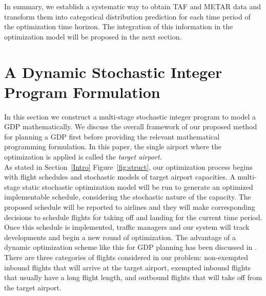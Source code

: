 \documentclass[12pt]{article}
\begin{document}
	\newline
	In summary, we establish a systematic way to obtain TAF and METAR data and transform them into categorical distribution prediction for each time period of the optimization time horizon. The integration of this information in the optimization model will be proposed in the next section.

\section{A Dynamic Stochastic Integer Program Formulation}\label{Model}
	In this section we construct a multi-stage stochastic integer program to model a GDP mathematically. We discuss the overall framework of our proposed method for planning a GDP first before providing the relevant mathematical programming formulation.  In this paper, the single airport where the optimization is applied is called the {\em target airport}.\\
	\newline As stated in Section~\ref{Intro} Figure~\ref{fig:struct}, our optimization process begins with flight schedules and stochastic models of target airport capacities. A multi-stage static stochastic optimization model will be run to generate an optimized implementable schedule, considering the stochastic nature of the capacity. The proposed schedule will be reported to airlines and they will make corresponding decisions to schedule flights for taking off and landing for the current time period. Once this schedule is implemented, traffic managers and our system will track developments and begin a new round of optimization. The advantage of a dynamic optimization scheme like this for GDP planning has been discussed in \cite{richetta1994dynamic}. \\
	\newline There are three categories of flights considered in our problem: non-exempted inbound flights that will arrive at the target airport, exempted inbound flights that usually have a long flight length, and outbound flights that will take off from the target airport. \\
	\newline
\end{document}
